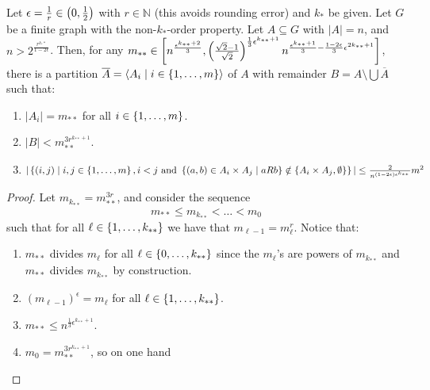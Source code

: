     \begin{theorem}[Theorem 4.16]
        Let $\epsilon = \frac{1}{r} \in \left( 0, \frac{1}{2} \right)$ with $r \in \mathbb{N}$ (this avoids rounding error)
        and $k_*$ be given.
        Let $G$ be a finite graph with the non-$k_*$-order property.
        Let $A \subseteq G$ with $|A| = n$, and $n > 2^{\frac{r^{k_**}}{1-2\epsilon}}$.
        Then, for any $m_{**} \in \left[ n^{\frac{\epsilon^{k_{**}+2}}{3}},
        \left( \frac{\sqrt{2}-1}{\sqrt{2}} \right)^{\frac{1}{3}\epsilon^{k_{**}+1}} n^{\frac{\epsilon^{k_{**}+1}}{3} -
        \frac{1-2\epsilon}{3}\epsilon^{2k_{**} + 1}} \right]$, there is a partition
        $\overline{A} = \left< A_i \mid i \in \left\{ 1, \dots, m \right\} \right>$ of $A$ with remainder
        $B = A \setminus \bigcup \overline{A}$ such that:
        \begin{enumerate}
            \item\label{itm:4.16.1} $|A_i| = m_{**}$ for all $i \in \left\{ 1, \dots, m \right\}$.
            \item\label{itm:4.16.2} $|B| < m_{**}^{3r^{k_{**}+1}}$.
            \item\label{itm:4.16.3} $|\left\{  (i,j) \mid i,j \in \left\{ 1, \dots, m \right\}, i < j \text{ and }
                \left\{ (a,b) \in A_i \times A_j \mid a R b \right\} \notin
                \left\{ A_i \times A_j, \emptyset \right\} \right\}|
                \leq \frac{2}{n^{(1-2\epsilon)\epsilon^{k_{**}}}} m^2$
        \end{enumerate}
        \begin{proof}
            Let $m_{k_{**}} = m_{**}^{3r}$, and consider the sequence
            \[
                m_{**} \leq m_{k_{**}} < \dots < m_0
            \]
            such that for all $\ell \in \left\{ 1, \dots, k_{**} \right\}$ we have that $m_{\ell-1} = m_\ell^r$.
            Notice that:
            \begin{enumerate}
                \item $m_{**}$ divides $m_\ell$ for all $\ell \in \left\{ 0, \dots, k_{**} \right\}$ since the $m_\ell$'s are powers of $m_{k_{**}}$
                    and $m_{**}$ divides $m_{k_{**}}$ by construction.
                \item $(m_{\ell-1})^\epsilon = m_\ell$ for all $\ell \in \left\{ 1, \dots, k_{**} \right\}$.
                \item $m_{**} \leq n^{\frac{1}{3}\epsilon^{k_{**}+1}}$.
                \item $m_0 = m_{**}^{3r^{k_{**}+1}}$, so on one hand

\end{enumerate}
\end{proof}
\end{theorem}
